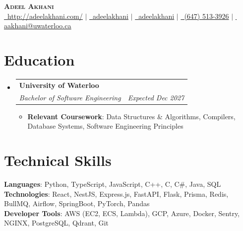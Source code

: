 \documentclass[letterpaper,11pt]{article}
\makeatletter
\newcommand{\resumeItem}[1]{
  \item\small{
    {#1 \vspace{-2pt}}
  }
}
\newcommand{\resumeSubheading}[4]{
  \vspace{-2pt}\item
    \begin{tabular*}{0.97\textwidth}[t]{l@{\extracolsep{\fill}}r}
      \textbf{#1} & #2 \\
      \textit{\small#3} & \textit{\small #4} \\
    \end{tabular*}\vspace{-7pt}
}
\newcommand{\resumeSubHeadingListStart}{\begin{itemize}[leftmargin=0.15in, label={}]}
\newcommand{\resumeSubHeadingListEnd}{\end{itemize}}
\newcommand{\resumeItemListStart}{\begin{itemize}}
\newcommand{\resumeItemListEnd}{\end{itemize}\vspace{-5pt}}
\makeatother
\begin{document}
\begin{center}
    \textbf{\Huge \scshape Adeel Akhani} \\ \vspace{1pt}
    \small
    \href{http://adeelakhani.com/}{\faGlobe\, \underline{http://adeelakhani.com/}} $|$
    \href{https://www.linkedin.com/in/adeelakhani/}{\faLinkedin\, \underline{adeelakhani}} $|$ 
    \href{https://github.com/adeelakhani}{\faGithub\, \underline{adeelakhani}} $|$
    \href{tel:(647) 513-3926}{\faMobile*\, (647) 513-3926} $|$
    \href{mailto:aakhani@uwaterloo.ca}{\faEnvelope\, \underline{aakhani@uwaterloo.ca}}
\end{center}
\section{Education}
    \resumeSubHeadingListStart
        \resumeSubheading
            {University of Waterloo}{}
            {Bachelor of Software Engineering}{\textit{Expected Dec 2027}}
            \resumeItemListStart
                \resumeItem{\textbf{Relevant Coursework}: Data Structures \& Algorithms, Compilers, Database Systems, Software Engineering Principles}
            \resumeItemListEnd
        \resumeSubHeadingListEnd
\section{Technical Skills}
\begin{itemize}[leftmargin=0.15in, label={}]
    \small{\item{
    \textbf{Languages}{: Python, TypeScript, JavaScript, C++, C, C\#, Java, SQL} \\
    \textbf{Technologies}{: React, NestJS, Express.js, FastAPI, Flask, Prisma, Redis, BullMQ, Airflow, SpringBoot, PyTorch, Pandas} \\
    \textbf{Developer Tools}{: AWS (EC2, ECS, Lambda), GCP, Azure, Docker, Sentry, NGINX, PostgreSQL, Qdrant, Git} 
    }}
\end{itemize}
\end{document}
